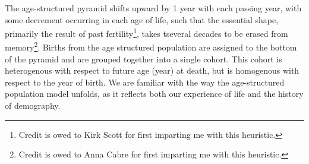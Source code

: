  \FloatBarrier
The age-structured pyramid shifts upward by 1 year with
each passing year, with some decrement occurring in each age of life, such that
the essential shape, primarily the result of past fertility\footnote{Credit is
owed to Kirk Scott for first imparting me with this heuristic.}, takes tseveral
decades to be erased from memory\footnote{Credit is owed to Anna Cabre for first
imparting me with this heuristic.}. Births from the age structured population 
are assigned to the bottom of the pyramid and are grouped 
together into a single cohort. This cohort is heterogenous with respect to
future age (year) at death, but is
homogenous with respect to the year of birth. We are familiar with
the way the age-structured population model unfolds, as it
reflects both our experience of life and the history of demography.